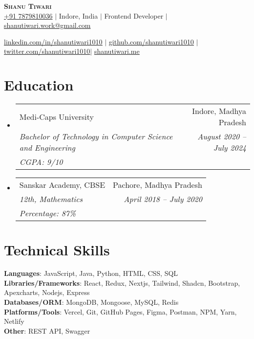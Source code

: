 \documentclass[letterpaper,11pt]{article}
\makeatletter
\newcommand{\resumeEduheading}[5]{
    \vspace{2pt}\item
      \begin{tabular*}{0.97\textwidth}[t]{l@{\extracolsep{\fill}}r}
        {#1} & #2 \\
        \textit{\small#3} & \textit{\small #4}\\
        \textit{\small#5} \\
      \end{tabular*}\vspace{-7pt}
  }
\newcommand{\resumeSubHeadingListStart}{\begin{itemize}[leftmargin=0.15in, label={}]}
\newcommand{\resumeSubHeadingListEnd}{\end{itemize}}
\makeatother
\begin{document}

\begin{center}
  \textbf{\Huge \scshape Shanu Tiwari} \\ \vspace{1pt}
  \href{tel:7879810036}{+91 7879810036} $|$
  {Indore, India} $|$
  {Frontend Developer} $|$
  \href{mailto:shanutiwari.work@gmail.com}{shanutiwari.work@gmail.com} \\ \vspace{1pt}

  \href{https://linkedin.com/in/shanutiwari1010}{\underline{linkedin.com/in/shanutiwari1010}} $|$
  \href{https://github.com/shanutiwari1010}{\underline{github.com/shanutiwari1010}} $|$
  \href{https://twitter.com/shanutiwari1010}{\underline{twitter.com/shanutiwari1010}}$|$
   \href{https://shanutiwari.me/}{\underline{shanutiwari.me}} 
  
\end{center}

\section{Education}
\resumeSubHeadingListStart
\resumeEduheading
{Medi-Caps University}{Indore, Madhya Pradesh}
{Bachelor of Technology in Computer Science and Engineering}{August 2020 -- July 2024}
{CGPA: 9/10}
\resumeEduheading
{Sanskar Academy, CBSE}{Pachore, Madhya Pradesh}
{12th, Mathematics}{April 2018 -- July 2020}
{Percentage: 87\%}
\resumeSubHeadingListEnd

\section{Technical Skills}
\begin{itemize}[leftmargin=0.15in, label={}]
  \small{\item{
        \textbf{Languages}{: \hfill JavaScript, Java, Python, HTML, CSS, SQL \hfill} \\
        \vspace{3pt}\textbf{Libraries/Frameworks}{: \hfill React, Redux, Nextjs, Tailwind, Shadcn, Bootstrap, Apexcharts, Nodejs, Express \hfill} \\
        \vspace{3pt}\textbf{Databases/ORM}{: \hfill MongoDB, Mongoose, MySQL, Redis \hfill} \\
        \vspace{3pt}\textbf{Platforms/Tools}{: \hfill Vercel, Git, GitHub Pages, Figma, Postman, NPM, Yarn, Netlify \hfill} \\
        \vspace{3pt}\textbf{Other}{: \hfill REST API, Swagger \hfill} \\
        }}
\end{itemize}
\end{document}
